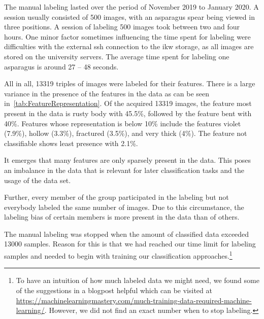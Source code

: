 \bigskip
The manual labeling lasted over the period of November 2019 to January 2020. A session usually consisted of 500 images, with an asparagus spear being viewed in three positions. A session of labeling 500 images took between two and four hours. One minor factor sometimes influencing the time spent for labeling were difficulties with the external \acrshort{ssh} connection to the \acrshort{ikw} storage, as all images are stored on the university servers. The average time spent for labeling one asparagus is around 27 -- 48 seconds.

All in all, 13319 triples of images were labeled for their features. There is a large variance in the presence of the features in the data as can be seen in~\autoref{tab:FeatureRepresentation}. Of the acquired 13319 images, the feature most present in the data is rusty body with 45.5\%, followed by the feature bent with 40\%. Features whose representation is below 10\% include the features violet (7.9\%), hollow (3.3\%), fractured (3.5\%), and very thick (4\%). The feature not classifiable shows least presence with 2.1\%. 

It emerges that many features are only sparsely present in the data. This poses an imbalance in the data that is relevant for later classification tasks and the usage of the data set.

Further, every member of the group participated in the labeling but not everybody labeled the same number of images. Due to this circumstance, the labeling bias of certain members is more present in the data than of others.

The manual labeling was stopped when the amount of classified data exceeded 13000 samples. Reason for this is that we had reached our time limit for labeling samples and needed to begin with training our classification approaches.\footnote{To have an intuition of how much labeled data we might need, we found some of the suggestions in a blogpost helpful which can be visited at \url{https://machinelearningmastery.com/much-training-data-required-machine-learning/}. However, we did not find an exact number when to stop labeling.}

